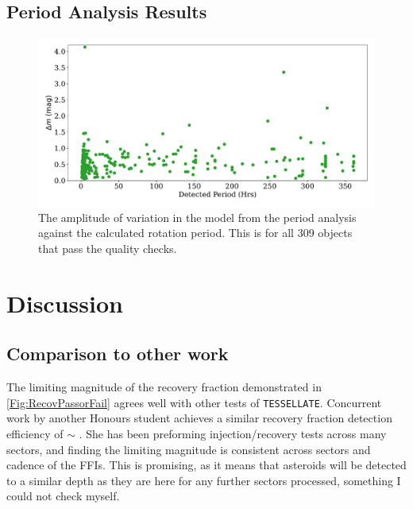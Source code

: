 \documentclass{UCreport}
\begin{document}
\subsection{Period Analysis Results}\label{SubSec:PerRes}


\begin{figure}
  \centering
  \includegraphics[width = \textwidth]{../OzData/QualPervsAmp1.pdf}
  \caption[Amplitude of Variation against Rotaion Period]{The amplitude of variation in the model from the period analysis against the calculated rotation period.
    This is for all 309 %
    objects that pass the quality checks.
  }
  \label{Fig:perVSamp}
\end{figure}


\section{Discussion}\label{Sec:Disc}

\subsection{Comparison to other work }%




The limiting magnitude of the recovery fraction demonstrated in \autoref{Fig:RecovPassorFail} agrees well with other tests of \texttt{TESSELLATE}.
Concurrent work by another Honours student \citep{MontillaHons} achieves a similar recovery fraction detection efficiency of $\sim$ \unit{\mag}.
She has been preforming injection/recovery tests across many sectors, and finding the limiting magnitude is consistent across sectors and cadence of the FFIs.
This is promising, as it means that asteroids will be detected to a similar depth as they are here for any further sectors processed, something I could not check myself.
\end{document}
